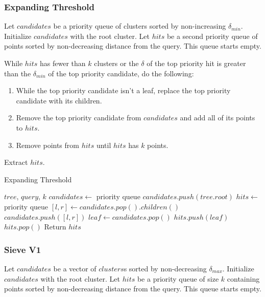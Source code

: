 \subsubsection{Expanding Threshold}
\label{subsubsec:methods:knn-search:expanding-threshold}

Let $candidates$ be a priority queue of clusters sorted by non-increasing $\delta_{min}$. Initialize $candidates$ with the root cluster.
Let $hits$ be a second priority queue of points sorted by non-decreasing distance from the query. This queue starts empty.

While $hits$ has fewer than $k$ clusters or the $\delta$ of the top priority hit is greater 
than the $\delta_{min}$ of the top priority candidate, do the following:
\begin{enumerate}
\item While the top priority candidate isn't a leaf, replace the top priority 
candidate with its children.
\item Remove the top priority candidate from $candidates$ and add all of its 
points to $hits$. 
\item Remove points from $hits$ until $hits$ has $k$ points. 
\end{enumerate}

Extract $hits$. 


\begin{algorithm} %
\caption{Expanding Threshold} %
\label{alg:expanding_threshold} %
\begin{algorithmic}[1] %
    \REQUIRE $tree$, $query$, $k$
    \STATE $candidates \leftarrow$ priority queue
    \STATE $candidates.push(tree.root)$
    \STATE $hits \leftarrow$ priority queue
            \STATE $[l, r] \leftarrow candidates.pop().children()$
            \STATE $candidates.push([l, r])$
        \ENDWHILE
        \STATE $leaf \leftarrow candidates.pop()$
        \STATE $hits.push(leaf)$
            \STATE $hits.pop()$
        \ENDWHILE
    \ENDWHILE
    \STATE Return $hits$
\end{algorithmic}
\end{algorithm}


\subsubsection{Sieve V1}
\label{subsubsec:methods:knn-search:sieve-v1}
Let $candidates$ be a vector of $clusters$s sorted by non-decreasing $\delta_{max}$. Initialize $candidates$ with  
the root cluster. 
Let $hits$ be a priority queue of size $k$ containing points sorted by non-decreasing distance from the query. This queue starts empty.

